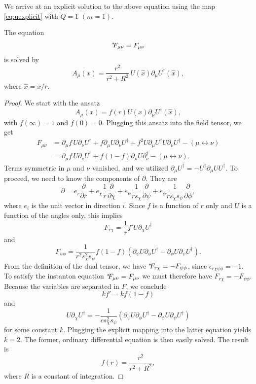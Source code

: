 We arrive at an explicit solution to the above equation using
the map \eqref{eq:uexplicit} with $Q=1$ $(m=1)$.
\begin{proposition}{}{}
The equation
$$
{}^{*\hspace{-1mm}}{F_{\mu\nu}}=F_{\mu\nu}
$$
is solved by
$$
  A_\mu(x)=\frac{r^2}{r^2+R^2}\,U(\hat{x})\partial_\mu U^\dagger(\hat{x}),
$$
where $\hat{x}=x/r.$
  \begin{proof} We start with the ansatz
    $$A_\mu(x)=f(r)U(\hat{x})\partial_\mu U^\dagger(\hat{x}),$$
    with $f(\infty)=1$ and $f(0)=0$. Plugging this ansatz into the
    field tensor, we get
    \begin{equation*}
    \begin{aligned}
      F_{\mu\nu}
        &=\partial_\mu f\,U\partial_\nu U^\dagger
          +f\partial_\mu U\partial_\nu U^\dagger
          +f^2U\partial_\mu U^\dagger U\partial_\nu U^\dagger
          -(\mu\leftrightarrow\nu)\\
        &=\partial_\mu f\,U\partial_\nu U^\dagger
          +f(1-f)\partial_\mu U\partial_\nu^\dagger
          -(\mu\leftrightarrow\nu).
    \end{aligned}
    \end{equation*}
    Terms symmetric in $\mu$ and $\nu$ vanished, and we utilized
    $\partial_\mu U^\dagger=-U^\dagger\partial_\mu UU^\dagger.$
    To proceed, we need to know the components of $\partial$.
    They are
    \begin{equation*}
     \partial=e_r\frac{\partial}{\partial r}
     +e_\chi\frac{1}{r}\frac{\partial}{\partial \chi}
     +e_\psi\frac{1}{rs_{\chi}}\frac{\partial}{\partial \psi}
     +e_\phi\frac{1}{rs_{\chi}s_{\psi}}\frac{\partial}{\partial \phi},
    \end{equation*}
    where $e_i$ is the unit vector in direction $i$. Since $f$ is
    a function of $r$ only and $U$ is a function of the angles
    only, this implies
    $$
      F_{r\chi}=\frac{1}{r}f'U\partial_\chi U^\dagger
    $$
    and
    $$
      F_{\psi\phi}=\frac{1}{r^2s^2_\chi s_\psi}
        f(1-f)\left(\partial_\psi U\partial_\phi U^\dagger
                    -\partial_\phi U\partial_\psi U^\dagger\right).
    $$
    From the definition of the dual tensor, we have
    ${}^{*\hspace{-1mm}}{F_{r\chi}}=-F_{\psi\phi}$, since $\epsilon_{r\chi\psi\phi}=-1$.
    To satisfy the instanton equation ${}^{*\hspace{-1mm}}{F_{\mu\nu}}=F_{\mu\nu}$
    we must therefore have $F_{r\chi}=-F_{\psi\phi}$. Because
    the variables are separated in $F$, we conclude
    $$
      kf'=kf(1-f)
    $$
    and
    $$
      U\partial_\chi U^\dagger=-\frac{1}{cs_\chi^2s_\psi}
               \left(\partial_\psi U\partial_\phi U^\dagger
                    -\partial_\phi U\partial_\psi U^\dagger\right) 
    $$
    for some constant $k$. Plugging the explicit mapping into the
    latter equation yields $k=2$. The former, ordinary differential
    equation is then easily solved. The result is
    $$
      f(r)=\frac{r^2}{r^2+R^2},
    $$
    where $R$ is a constant of integration.
\end{proof}
\end{proposition}

